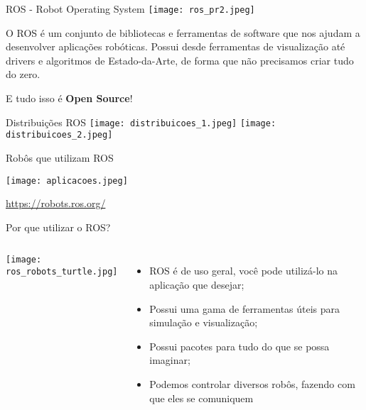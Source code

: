 \begin{frame}[t]{ROS - Robot Operating System} 
  \centering
  \texttt{[image: ros\_pr2.jpeg]}
  
  \vspace{.5cm}
  O ROS é um conjunto de bibliotecas e ferramentas de software que nos ajudam a desenvolver aplicações robóticas. Possui desde ferramentas de visualização até drivers e algoritmos de Estado-da-Arte, de forma que não precisamos criar tudo do zero.

  E tudo isso é \textbf{Open Source}!
\end{frame}


\begin{frame}[t]{Distribuições ROS} 
  \centering
  \texttt{[image: distribuicoes\_1.jpeg]}
  \texttt{[image: distribuicoes\_2.jpeg]}
\end{frame}


\begin{frame}[t]{Robôs que utilizam ROS} 
  \centering

  \vspace{1.5cm}
  \texttt{[image: aplicacoes.jpeg]}
  
  \href{https://robots.ros.org/}{https://robots.ros.org/}

\end{frame}


\begin{frame}[t]{Por que utilizar o ROS?} 
  \begin{columns}
    \texttt{[image: ros\_robots\_turtle.jpg]}
    
    \begin{itemize}[<+->]
      \item ROS é de uso geral, você pode utilizá-lo na aplicação que desejar;
      \item Possui uma gama de ferramentas úteis para simulação e visualização;
      \item Possui pacotes para tudo do que se possa imaginar;
      \item Podemos controlar diversos robôs, fazendo com que eles se comuniquem
    \end{itemize}

  \end{columns}
\end{frame}


